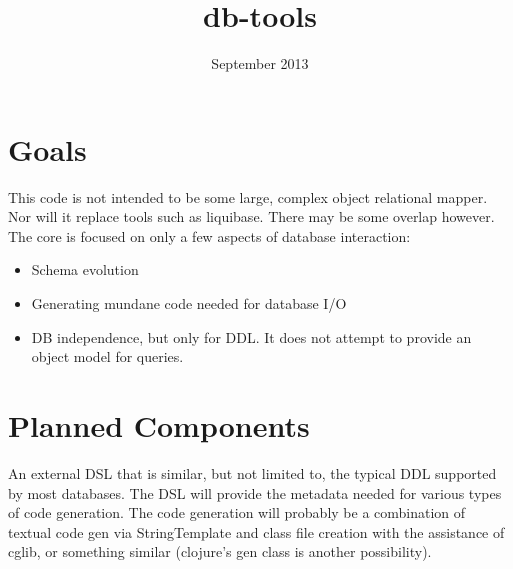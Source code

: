 \documentclass[10pt]{article}
\title{db-tools}
\date{September 2013}
\begin{document}
 \maketitle
\section{Goals}
This code is not intended to be some large, complex object relational mapper. 
Nor will it replace tools such as liquibase. There may be some overlap however. The core 
is focused on only a few aspects of database interaction: 
\begin{itemize}
	\item Schema evolution
	\item Generating mundane code needed for database I/O
    \item DB independence, but only for DDL. It does not attempt to provide an object model for queries.
\end{itemize}

\section{Planned Components}
An external DSL that is similar, but not limited to, the typical DDL supported by most databases. 
The DSL will provide the metadata needed for various types of code generation. The code 
generation will probably be a combination of textual code gen via StringTemplate and class file 
creation with the assistance of cglib, or something similar (clojure's gen class is another possibility).



\end{document}
